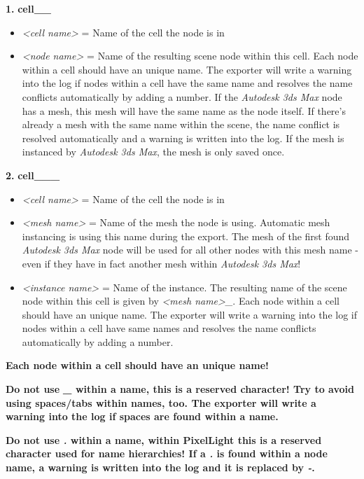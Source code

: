 \textbf{1.}
\textbf{cell\_<cell name>\_<node name>}
\begin{itemize}
\item{\emph{<cell name>} = Name of the cell the node is in}
\item{\emph{<node name>} = Name of the resulting scene node within this cell. Each node within a cell should have an unique name. The exporter will write a warning into the log if nodes within a cell have the same name and resolves the name conflicts automatically by adding a number. If the \emph{Autodesk 3ds Max} node has a mesh, this mesh will have the same name as the node itself. If there's already a mesh with the same name within the scene, the name conflict is resolved automatically and a warning is written into the log. If the mesh is instanced by \emph{Autodesk 3ds Max}, the mesh is only saved once.}
\end{itemize}

\textbf{2.}
\textbf{cell\_<cell name>\_<mesh name>\_<instance name>}
\begin{itemize}
\item{\emph{<cell name>} = Name of the cell the node is in}
\item{\emph{<mesh name>} = Name of the mesh the node is using. Automatic mesh instancing is using this name during the export. The mesh of the first found \emph{Autodesk 3ds Max} node will be used for all other nodes with this mesh name - even if they have in fact another mesh within \emph{Autodesk 3ds Max}!}
\item{\emph{<instance name>} = Name of the instance. The resulting name of the scene node within this cell is given by \emph{<mesh name>\_<instance name>}. Each node within a cell should have an unique name. The exporter will write a warning into the log if nodes within a cell have same names and resolves the name conflicts automatically by adding a number.}
\end{itemize}

\textbf{Each node within a cell should have an unique name!}

\textbf{Do not use \emph{\_} within a name, this is a reserved character! Try to avoid using spaces/tabs within names, too. The exporter will write a warning into the log if spaces are found within a name.}

\textbf{Do not use \emph{.} within a name, within PixelLight this is a reserved character used for name hierarchies! If  a \emph{.} is found within a node name, a warning is written into the log and it is replaced by \emph{-}.}

